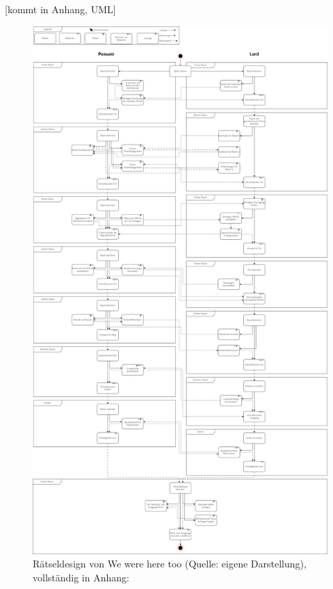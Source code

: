 [kommt in Anhang, UML]
\begin{figure}[ht]
\centering
\includegraphics[width=0.8\linewidth]{content/pictures/WeWereHereTooUML.png}
\caption{Rätseldesign von We were here too (Quelle: eigene Darstellung), vollständig in Anhang: }
\label{fig:wwht-uml}
\end{figure}
